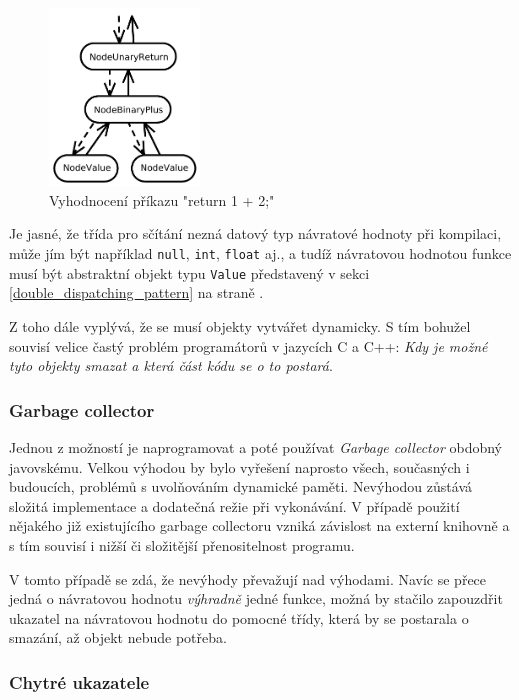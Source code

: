 \documentclass[11pt,twoside,a4paper]{book}
\begin{document}
\begin{figure}[ht]
\begin{center}
\includegraphics[width=4cm]{img/execute.pdf}
\caption{Vyhodnocení příkazu "return 1 + 2;"}
\label{fig:execute}
\end{center}
\end{figure}

Je jasné, že třída pro sčítání nezná datový typ návratové hodnoty při kompilaci, může jím být například \texttt{null}, \texttt{int}, \texttt{float} aj., a tudíž návratovou hodnotou funkce musí být abstraktní objekt typu \texttt{Value} představený v sekci \ref{double_dispatching_pattern} na straně \pageref{double_dispatching_pattern}.

Z toho dále vyplývá, že se musí objekty vytvářet dynamicky. S tím bohužel souvisí velice častý problém programátorů v jazycích C a C++: \textit{Kdy je možné tyto objekty smazat a která část kódu se o to postará}.


\subsubsection{Garbage collector}

Jednou z možností je naprogramovat a poté používat \textit{Garbage collector} obdobný javovskému. Velkou výhodou by bylo vyřešení naprosto všech, současných i budoucích, problémů s u\-vol\-ňo\-vá\-ním dynamické paměti. Nevýhodou zůstává složitá implementace a dodatečná režie při vykonávání. V případě použití nějakého již existujícího garbage collectoru vzniká závislost na externí knihovně a s tím souvisí i nižší či složitější přenositelnost programu.

V tomto případě se zdá, že nevýhody převažují nad výhodami. Navíc se přece jedná o ná\-vra\-to\-vou hodnotu \textit{výhradně} jedné funkce, možná by stačilo zapouzdřit ukazatel na návratovou hodnotu do pomocné třídy, která by se postarala o smazání, až objekt nebude potřeba.


\subsubsection{Chytré ukazatele}
\end{document}
